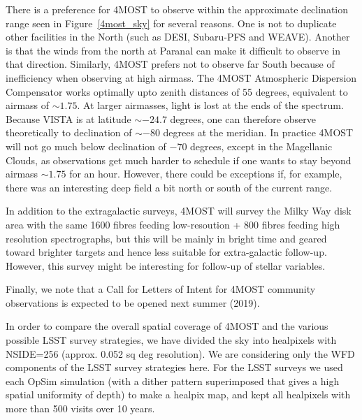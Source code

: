 There is a preference for 4MOST to observe within the approximate
declination range seen in Figure~\ref{4most_sky} for several
reasons. One is not to duplicate other facilities in the North (such
as DESI, Subaru-PFS and WEAVE). Another is that the winds from the
north at Paranal can make it difficult to observe in that
direction. Similarly, 4MOST prefers not to observe far South because
of inefficiency when observing at high airmass. The 4MOST Atmospheric
Dispersion Compensator works optimally upto zenith distances of 55
degrees, equivalent to airmass of $\sim1.75$. At larger airmasses,
light is lost at the ends of the spectrum. Because VISTA is at
latitude $\sim -24.7$ degrees, one can therefore observe theoretically
to declination of $\sim -80$ degrees at the meridian. In practice
4MOST will not go much below declination of $-70$ degrees, except in
the Magellanic Clouds, as observations get much harder to schedule if
one wants to stay beyond airmass $\sim 1.75$ for an hour. However,
there could be exceptions if, for example, there was an interesting
deep field a bit north or south of the current range.

In addition to the extragalactic surveys, 4MOST will survey the Milky
Way disk area with the same 1600 fibres feeding low-resoution + 800
fibres feeding high resolution spectrographs, but this will be mainly
in bright time and geared toward brighter targets and hence less
suitable for extra-galactic follow-up. However, this survey might be
interesting for follow-up of stellar variables.

Finally, we note that a Call for Letters of Intent for 4MOST community
observations is expected to be opened next summer (2019).



In order to compare the overall spatial coverage of 4MOST and the
various possible LSST survey strategies, we have divided the sky into
healpixels with NSIDE=256 (approx. 0.052 sq deg resolution). We are
considering only the WFD components of the LSST survey strategies
here.
For the LSST surveys we used each OpSim simulation (with a dither
pattern superimposed that gives a high spatial uniformity of depth) to
make a healpix map, and kept all healpixels with more than 500 visits
over 10 years.

\begin{comment}
\footnote{The code used to
  make these is the script
  {\tt https://github.com/rbiswas4/OpSimSummary/blob/master/scripts/make\_simlibs.py}}
\end{comment}

